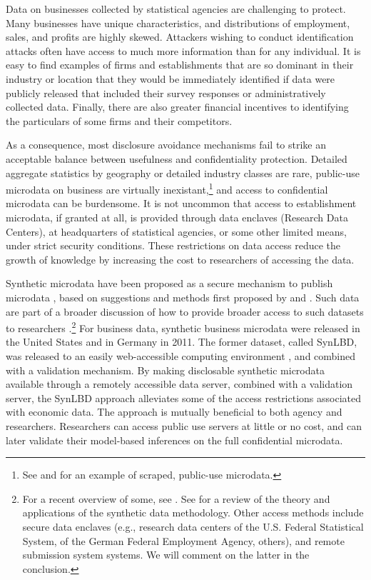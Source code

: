 
Data on businesses collected by statistical agencies are challenging to protect. Many businesses have unique characteristics, and distributions of employment, sales, and profits are highly skewed. Attackers wishing to conduct identification attacks often have access to much more information than for any individual. It is easy to find examples of firms and establishments that are so dominant in their industry or location that they would be immediately identified if  data were publicly released that included their survey responses or administratively collected data. Finally, there are also greater financial incentives to identifying the particulars of some firms and their competitors.

As a consequence, most disclosure avoidance mechanisms  fail to strike an acceptable balance between usefulness and confidentiality protection. Detailed aggregate statistics by geography or detailed industry classes  are rare, public-use microdata on business are virtually inexistant,\footnote{See \citet{NBERw22095} and \citet{startupcartography} for an example of scraped, public-use microdata.} and access to confidential microdata can be burdensome. It is not uncommon that access to establishment microdata, if granted at all, is provided through data enclaves (Research Data Centers), at headquarters of statistical agencies, or some other limited means, under strict security conditions. These restrictions on data access reduce the growth of knowledge by increasing the cost to researchers of accessing the data.

Synthetic microdata have been proposed as a secure mechanism to publish microdata \citep{RePEc:spr:alstar:v:95:y:2011:i:1:p:1-26,RePEc:taf:japsta:v:39:y:2012:i:2:p:243-265,NAP11844,SJIAOS-2014c}, based on suggestions and methods first proposed by \citet{rubin93} and \citet{little93}. Such data are  part of a broader discussion of how  to provide broader access to such datasets to researchers  \citep{Bender2009,Vilhuber2013,AbowdLane2004,AbowdSchmutte_BPEA2015}.\footnote{
	For a recent overview of some, see \citet{VilhuberAbowdReiter:Synthetic:SJIAOS:2016}. See \citet{dre:2011} for a review of the theory and applications of the synthetic data methodology.
	Other access methods include secure data enclaves (e.g., research data centers of the U.S. Federal Statistical System, of the  German Federal Employment Agency, others), and  remote submission system systems. We will comment on the latter in the conclusion. }
For business data, synthetic business microdata were released in the United States \citep{KinneyEtAl2011} and in Germany  \citep{RePEc:iab:iabfme:201101_de} in 2011. The former dataset, called \ac{SynLBD}, was  released to an easily web-accessible computing environment \citep{AbowdVilhuber2010}, and combined with a validation mechanism. By making disclosable synthetic microdata available through a remotely accessible data server, combined with a validation server, the SynLBD approach alleviates some of the access restrictions associated with economic data. The approach is mutually beneficial to both agency and researchers. Researchers can access public use servers at little or no cost, and can later validate their model-based inferences on the full confidential microdata.



